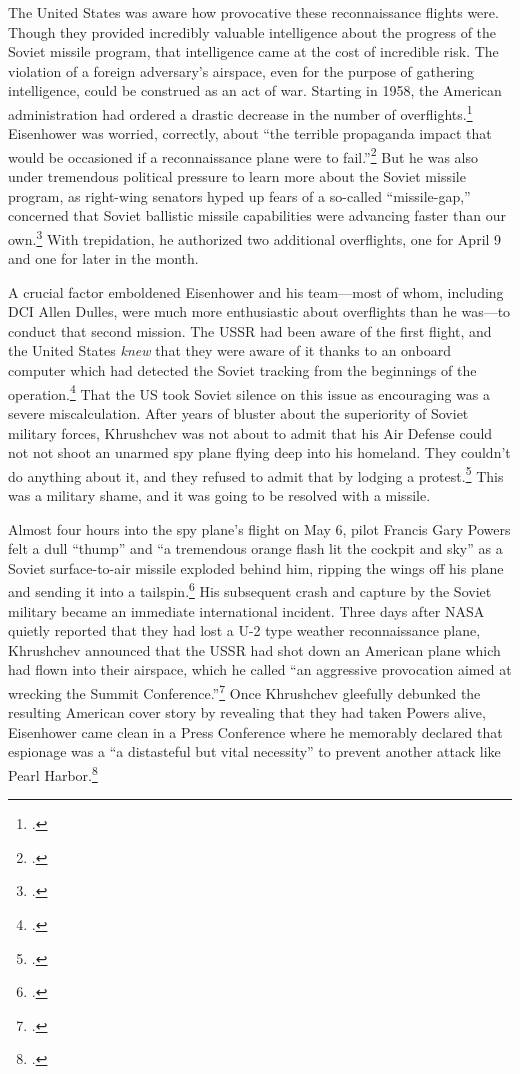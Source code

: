 \documentclass[12pt]{article}
\begin{document}
The United States was aware how provocative these reconnaissance flights were. Though they provided incredibly valuable intelligence about the progress of the Soviet missile program, that intelligence came at the cost of incredible risk. The violation of a foreign adversary's airspace, even for the purpose of gathering intelligence, could be construed as an act of war. Starting in 1958, the American administration had ordered a drastic decrease in the number of overflights.\footcite[p.~51]{powers_operation_2004} Eisenhower was worried, correctly, about ``the terrible propaganda impact that would be occasioned if a reconnaissance plane were to fail.''\footcite[p.~162]{pedlow_cia_1998} But he was also under tremendous political pressure to learn more about the Soviet missile program, as right-wing senators hyped up fears of a so-called ``missile-gap,'' concerned that Soviet ballistic missile capabilities were advancing faster than our own.\footcite{licklider_missile_1970} With trepidation, he authorized two additional overflights, one for April 9 and one for later in the month.

A crucial factor emboldened Eisenhower and his team---most of whom, including DCI Allen Dulles, were much more enthusiastic about overflights than he was---to conduct that second mission. The USSR had been aware of the first flight, and the United States \emph{knew} that they were aware of it thanks to an onboard computer which had detected the Soviet tracking from the beginnings of the operation.\footcite{pedlow_cia_1998} That the US took Soviet silence on this issue as encouraging was a severe miscalculation. After years of bluster about the superiority of Soviet military forces, Khrushchev was not about to admit that his Air Defense could not not shoot an unarmed spy plane flying deep into his homeland. They couldn't do anything about it, and they refused to admit that by lodging a protest.\footcite[p.~59]{powers_operation_2004} This was a military shame, and it was going to be resolved with a missile.

Almost four hours into the spy plane's flight on May 6, pilot Francis Gary Powers felt a dull ``thump'' and ``a tremendous orange flash lit the cockpit and sky'' as a Soviet surface-to-air missile exploded behind him, ripping the wings off his plane and sending it into a tailspin.\footcite[p.~61]{powers_operation_2004} His subsequent crash and capture by the Soviet military became an immediate international incident. Three days after NASA quietly reported that they had lost a U-2 type weather reconnaissance plane, Khrushchev announced that the USSR had shot down an American plane which had flown into their airspace, which he called ``an aggressive provocation aimed at wrecking the Summit Conference.''\footcite[p.~112]{powers_operation_2004} Once Khrushchev gleefully debunked the resulting American cover story by revealing that they had taken Powers alive, Eisenhower came clean in a Press Conference where he memorably declared that espionage was a ``a distasteful but vital necessity'' to prevent another attack like Pearl Harbor.\footcite{eisenhower_news_1960}
\end{document}
